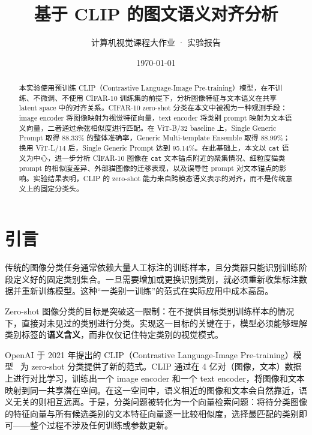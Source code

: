 \documentclass[12pt,a4paper]{ctexart}
\title{\vspace{-1.5em}\Large\bfseries 基于 CLIP 的图文语义对齐分析}
\author{计算机视觉课程大作业 · 实验报告}
\date{\today}
\begin{document}
\maketitle

\begin{abstract}
本实验使用预训练 CLIP（Contrastive Language-Image Pre-training）模型，在不训练、不微调、不使用 CIFAR-10 训练集的前提下，分析图像特征与文本语义在共享 latent space 中的对齐关系。CIFAR-10 zero-shot 分类在本文中被视为一种观测手段：image encoder 将图像映射为视觉特征向量，text encoder 将类别 prompt 映射为文本语义向量，二者通过余弦相似度进行匹配。在 ViT-B/32 baseline 上，Single Generic Prompt 取得 88.33\% 的整体准确率，Generic Multi-template Ensemble 取得 88.99\%；换用 ViT-L/14 后，Single Generic Prompt 达到 95.14\%。在此基础上，本文以 \texttt{cat} 语义为中心，进一步分析 CIFAR-10 图像在 \texttt{cat} 文本锚点附近的聚集情况、细粒度猫类 prompt 的相似度差异、外部猫图像的迁移表现，以及误导性 prompt 对文本锚点的影响。实验结果表明，CLIP 的 zero-shot 能力来自跨模态语义表示的对齐，而不是传统意义上的固定分类头。
\end{abstract}

\newpage
\tableofcontents
\newpage

\section{引言}

传统的图像分类任务通常依赖大量人工标注的训练样本，且分类器只能识别训练阶段定义好的固定类别集合。一旦需要增加或更换识别类别，就必须重新收集标注数据并重新训练模型。这种“一类别一训练”的范式在实际应用中成本高昂。

Zero-shot 图像分类的目标是突破这一限制：在不提供目标类别训练样本的情况下，直接对未见过的类别进行分类。实现这一目标的关键在于，模型必须能够理解类别标签的\textbf{语义含义}，而非仅仅记住特定类别的视觉模式。

OpenAI 于 2021 年提出的 CLIP（Contrastive Language-Image Pre-training）模型~\cite{radford2021clip} 为 zero-shot 分类提供了新的范式。CLIP 通过在 4 亿对（图像，文本）数据上进行对比学习，训练出一个 image encoder 和一个 text encoder，将图像和文本映射到同一共享潜在空间。在这一空间中，语义相近的图像和文本会自然靠近，语义无关的则相互远离。于是，分类问题被转化为一个向量检索问题：将待分类图像的特征向量与所有候选类别的文本特征向量逐一比较相似度，选择最匹配的类别即可——整个过程不涉及任何训练或参数更新。
\end{document}
